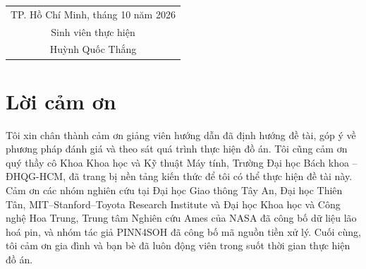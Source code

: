 \documentclass[12pt,a4paper,oneside]{report}
\theoremstyle{plain}
\theoremstyle{definition}
\begin{document}
\vspace{1.2cm}
\hfill\begin{tabular}{c}TP. Hồ Chí Minh, tháng 10 năm 2026\\ Sinh viên thực hiện\\[1.6cm] Huỳnh Quốc Thắng\end{tabular}

\chapter*{Lời cảm ơn}
Tôi xin chân thành cảm ơn giảng viên hướng dẫn đã định hướng đề tài, góp ý về phương pháp đánh giá và theo sát
quá trình thực hiện đồ án. Tôi cũng cảm ơn quý thầy cô Khoa Khoa học và Kỹ thuật Máy tính, Trường Đại học Bách
khoa -- ĐHQG-HCM, đã trang bị nền tảng kiến thức để tôi có thể thực hiện đề tài này. Cảm ơn các nhóm nghiên cứu
tại Đại học Giao thông Tây An, Đại học Thiên Tân, MIT--Stanford--Toyota Research Institute và Đại học Khoa học và
Công nghệ Hoa Trung, Trung tâm Nghiên cứu Ames của NASA đã công bố dữ liệu lão hoá pin, và nhóm tác giả PINN4SOH đã
công bố mã nguồn tiền xử lý.
Cuối cùng, tôi cảm ơn gia đình và bạn bè đã luôn động viên trong suốt thời gian thực hiện đồ án.
\end{document}
